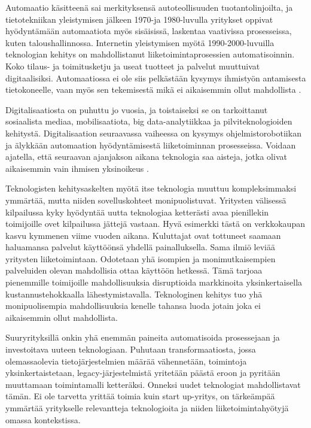 \documentclass[finnish,12pt,a4paper,pdftex]{article}
\begin{document}
Automaatio käsitteenä sai merkityksensä autoteollisuuden tuotantolinjoilta, ja tietotekniikan yleistymisen jälkeen 1970-ja 1980-luvulla yritykset oppivat hyödyntämään automaatiota myös sisäisissä, laskentaa vaativissa prosesseissa, kuten taloushallinnossa. Internetin yleistymisen myötä 1990-2000-luvuilla teknologian kehitys on mahdollistanut liiketoimintaprosessien automatisoinnin. Koko tilaus- ja toimitusketju ja useat tuotteet ja palvelut muuttuivat digitaalisiksi. Automaatiossa ei ole siis pelkästään kysymys ihmistyön antamisesta tietokoneelle, vaan myös sen tekemisestä mikä ei aikaisemmin ollut mahdollista \citep{groover}.

Digitalisaatiosta on puhuttu jo vuosia, ja toistaiseksi se on tarkoittanut sosiaalista mediaa, mobilisaatiota, big data-analytiikkaa ja pilviteknologioiden kehitystä. Digitalisaation seuraavassa vaiheessa on kysymys ohjelmistorobotiikan ja älykkään automaation hyödyntämisestä liiketoiminnan prosesseissa. Voidaan ajatella, että seuraavan ajanjakson aikana teknologia saa aisteja, jotka olivat aikaisemmin vain ihmisen yksinoikeus \citep{groover}.

Teknologisten kehitysaskelten myötä itse teknologia muuttuu kompleksimmaksi ymmärtää, mutta niiden sovelluskohteet monipuolistuvat. Yritysten välisessä kilpailussa kyky hyödyntää uutta teknologiaa ketterästi avaa pienillekin toimijoille ovet kilpailussa jättejä vastaan. Hyvä esimerkki tästä on verkkokaupan kasvu kymmenen viime vuoden aikana. Kuluttajat ovat tottuneet saamaan haluamansa palvelut käyttöönsä yhdellä painalluksella. Sama ilmiö leviää yritysten liiketoimintaan. Odotetaan yhä isompien ja monimutkaisempien palveluiden olevan mahdollisia ottaa käyttöön hetkessä. Tämä tarjoaa pienemmille toimijoille mahdollisuuksia disruptioida markkinoita yksinkertaisella kustannustehokkaalla lähestymistavalla. Teknologinen kehitys tuo yhä monipuolisempia mahdollisuuksia kenelle tahansa luoda jotain joka ei aikaisemmin ollut mahdollista. \citep{lamoureux}

Suuryrityksillä onkin yhä enemmän paineita automatisoida prosessejaan ja investoitava uuteen teknologiaan. Puhutaan transformaatiosta, jossa olemassaolevia tietojärjestelmien määrää vähennetään, toimintoja yksinkertaistetaan,  legacy-järjestelmistä yritetään päästä eroon ja pyritään muuttamaan toimintamalli ketteräksi. Onneksi uudet teknologiat mahdollistavat tämän. Ei ole tarvetta yrittää toimia kuin start up-yritys, on tärkeämpää ymmärtää yritykselle relevantteja teknologioita ja niiden liiketoimintahyötyjä omassa kontekstissa. \citep{lamoureux}
\end{document}
